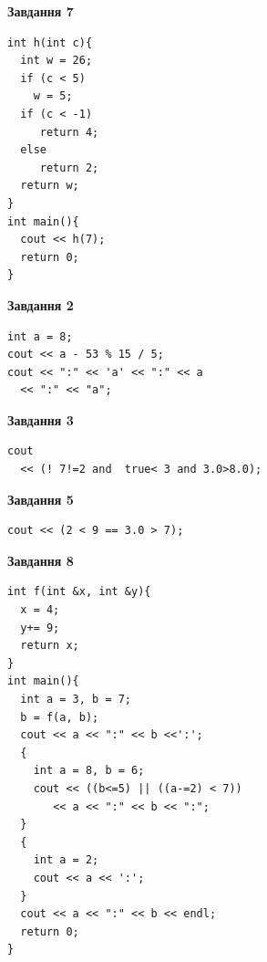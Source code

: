 \documentclass[12pt, ukrainian]{article}
\begin{document}
{\begin {large}
\begin{minipage}[t]{7.0cm}
\begin{center}
\textbf{Завдання 7}
\end{center}
\vspace{-8mm}

\begin{verbatim}
int h(int c){
  int w = 26;
  if (c < 5)
    w = 5;
  if (c < -1)
     return 4;
  else
     return 2;
  return w;
}
int main(){
  cout << h(7);
  return 0;
}
\end{verbatim}

\end{minipage}
\vline \hspace{1mm}
\begin{minipage}[t]{11.0cm}

\begin{center}
\textbf{Завдання 2}
\end{center}
\vspace{-8mm}

\begin{verbatim}
int a = 8;
cout << a - 53 % 15 / 5;
cout << ":" << 'a' << ":" << a 
  << ":" << "a";
\end{verbatim}



\begin{center}
\textbf{Завдання 3}
\end{center}
\vspace{-8mm}

\begin{verbatim}
cout 
  << (! 7!=2 and  true< 3 and 3.0>8.0);
\end{verbatim}



\begin{center}
\textbf{Завдання 5}
\end{center}
\vspace{-8mm}

\begin{verbatim}
cout << (2 < 9 == 3.0 > 7);
\end{verbatim}



\begin{center}
\textbf{Завдання 8}
\end{center}
\vspace{-8mm}

\begin{verbatim}
int f(int &x, int &y){
  x = 4;
  y+= 9;
  return x;
}
int main(){
  int a = 3, b = 7;
  b = f(a, b);
  cout << a << ":" << b <<':';
  {
    int a = 8, b = 6;
    cout << ((b<=5) || ((a-=2) < 7))
       << a << ":" << b << ":";
  }
  {
    int a = 2;
    cout << a << ':';
  }
  cout << a << ":" << b << endl;
  return 0;
}
\end{verbatim}


\end{minipage}
\end{large}}
\end{document}

